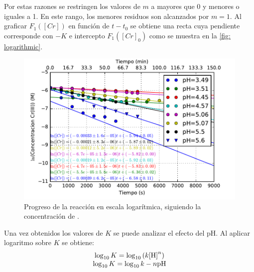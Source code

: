 \documentclass[fleqn,10pt]{SelfArx} %
\begin{document}
    Por estas razones se restringen los valores de $m$ a mayores que 0 y menores o iguales a 1. En este rango, los menores residuos son alcanzados por $m=1$. Al graficar $F_1([Cr])$ en funci\'on de $t-t_0$ se obtiene una recta cuya pendiente corresponde con $-K$ e intercepto $F_1([Cr]_0)$ como se muestra en la \autoref{fig: logarithmic}.
	\begin{figure}[h]
	    \centering
	    \includegraphics[width=\linewidth]{images/Logarithmic.pdf}
	    \caption{Progreso de la reacci\'on en escala logar\'itmica, siguiendo la concentraci\'on de .}
	    \label{fig: logarithmic}
	\end{figure}
	
	Una vez obtenidos los valores de $K$ se puede analizar el efecto del pH. Al aplicar logaritmo sobre $K$ se obtiene:
	\begin{equation}
	    \begin{array}{c}
    	    \log_{10}K=\log_{10}\left(k\ce{[H]}^n\right) \\
    	    \log_{10}K=\log_{10}k - n\text{pH}
	    \end{array}
	\end{equation}
	
\end{document}
